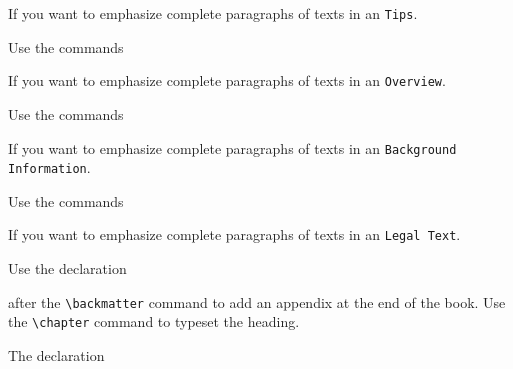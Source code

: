 \documentclass[graybox]{svmult}
\begin{document}
\begin{refguide}
\begin{sloppy}
If you want to emphasize complete paragraphs of texts in an \verb|Tips|.  

Use the commands

\cprotect{}

If you want to emphasize complete paragraphs of texts in an \verb|Overview|.  

\eject

Use the commands

\cprotect{}

If you want to emphasize complete paragraphs of texts in an \verb|Background| \verb|Information|.  

Use the commands

\cprotect{}

If you want to emphasize complete paragraphs of texts in an \verb|Legal Text|.  

Use the declaration

\cprotect\boxtext{\verb|\appendix|}

after the \verb|\backmatter| command to add an appendix at the end of the book.
Use the \verb|\chapter| command to typeset the heading.

The declaration


\end{sloppy}
\end{refguide}
\end{document}

